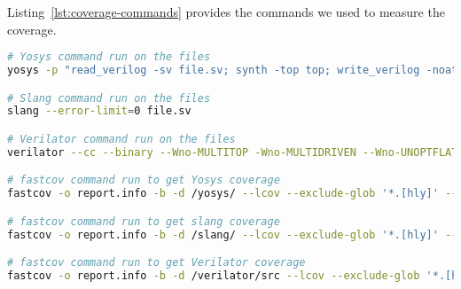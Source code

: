 Listing~\ref{lst:coverage-commands} provides the commands we used to measure the coverage.

\begin{lstlisting}[language=bash,caption={Commands to measure coverage},label={lst:coverage-commands},breaklines=true]
# Yosys command run on the files
yosys -p "read_verilog -sv file.sv; synth -top top; write_verilog -noattr /testFiles/synth_out/synth.v"

# Slang command run on the files
slang --error-limit=0 file.sv

# Verilator command run on the files
verilator --cc --binary --Wno-MULTITOP -Wno-MULTIDRIVEN --Wno-UNOPTFLAT --Wno-NOLATCH --Wno-WIDTHTRUNC --Wno-CMPCONST --Wno-WIDTHEXPAND --Wno-UNSIGNED --threads 8 --comp-limit-blocks 10 file.sv

# fastcov command run to get Yosys coverage
fastcov -o report.info -b -d /yosys/ --lcov --exclude-glob '*.[hly]' --include .cc .cpp --exclude /usr/include

# fastcov command run to get slang coverage
fastcov -o report.info -b -d /slang/ --lcov --exclude-glob '*.[hly]' --include .cc .cpp --exclude /usr/include analysis/ diagnostics/ driver/ numeric/ syntax/text/ util/ /slang/build

# fastcov command run to get Verilator coverage
fastcov -o report.info -b -d /verilator/src --lcov --exclude-glob '*.[hly]' --include .cpp --exclude /usr/include V3Coverage.cpp V3CoverageJoin.cpp V3EmitCMake.cpp V3EmitXml.cpp V3ExecGraph.cpp V3GraphTest.cpp V3HierBlock.cpp V3Trace.cpp V3TraceDecl.cppV3EmitV.cpp V3TSP.cpp V3Scoreboard.cpp V3Stats.cpp V3ProtectLib.cpp V3Broken.cpp V3Interface.cpp
\end{lstlisting}
